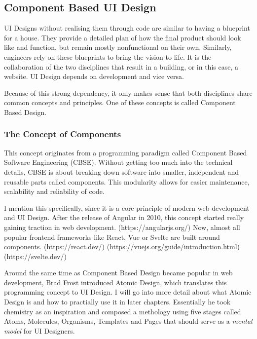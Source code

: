 \newpage
\subsection{Component Based UI Design}
UI Designs without realising them through code are similar to having a blueprint for a house. They
provide a detailed plan of how the final product should look like and function, but remain mostly
nonfunctional on their own. Similarly, engineers rely on these blueprints to bring the vision to
life. It is the collaboration of the two disciplines that result in a building, or in this case, a
website. UI Design depends on development and vice versa. 

Because of this strong dependency, it only makes sense that both disciplines share common concepts
and principles. One of these concepts is called Component Based Design.

\subsubsection{The Concept of Components}
This concept originates from a programming paradigm called Component Based Software Engineering
(CBSE). Without getting too much into the technical details, CBSE is about breaking down software
into smaller, independent and reusable parts called components. This modularity allows for easier
maintenance, scalability and reliability of code.

I mention this specifically, since it is a core principle of modern web development and UI Design.
After the release of Angular in 2010, this concept started really gaining traction in web development.
(https://angularjs.org/)
Now, almost all popular frontend frameworks like React, Vue or Svelte are built around components.
(https://react.dev/) (https://vuejs.org/guide/introduction.html) (https://svelte.dev/)

Around the same time as Component Based Design became popular in web development, Brad Frost
introduced Atomic Design, which translates this programming concept to UI Design. I will go into
more detail about what Atomic Design is and how to practially use it in later chapters. Essentially
he took chemistry as an inspiration and composed a methology using five stages called Atoms,
Molecules, Organisms, Templates and Pages that should serve as a \textit{mental model} for UI
Designers. 

